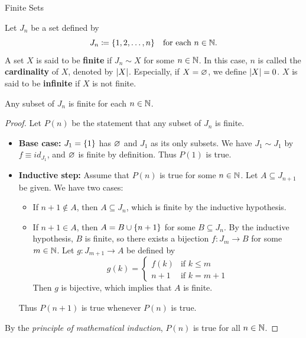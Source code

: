 \begin{section}{Finite Sets} \label{sec:FiniteSets}

Let $J_{n}$ be a set defined by
\[
J_{n} \coloneqq \set*{1, 2, \dots, n} \quad \text{for each } n \in \N.
\]
A set $X$ is said to be \textbf{finite} if $J_{n} \hyperref[thm:BijectionEquivalenceRelation]{\sim} X$ for some
$n \in \N$. In this case, $n$ is called the \textbf{cardinality} of $X$, denoted by $\abs*{X}$.
Especially, if $X = \vnot$, we define $\abs*{X} = 0$. $X$ is said to be \textbf{infinite} if $X$ is not finite.

\bigskip

\begin{lemma} \label{lem:SubsetOfJnIsFinite}
    Any subset of $J_{n}$ is finite for each $n \in \N$.
\end{lemma}

\begin{proof}
    Let $P(n)$ be the statement that any subset of $J_{n}$ is finite.
    \begin{itemize}
        \item \textbf{Base case:} $J_{1} = \set*{1}$ has $\vnot$ and $J_{1}$ as its only subsets. We have
        $J_{1} \hyperref[thm:BijectionEquivalenceRelation]{\sim} J_{1}$ by $f \equiv id_{J_{1}}$, and $\vnot$ is
        finite by definition. Thus $P(1)$ is true.
        \item \textbf{Inductive step:} Assume that $P(n)$ is true for some $n \in \N$.
        Let $A \subseteq J_{n + 1}$ be given. We have two cases:
        \begin{itemize}
            \item If $n + 1 \notin A$, then $A \subseteq J_{n}$, which is finite by the inductive hypothesis.
            \item If $n + 1 \in A$, then $A = B \cup \set*{n + 1}$ for some $B \subseteq J_{n}$.
            By the inductive hypothesis, $B$ is finite, so there exists a bijection $f: J_{m} \to B$
            for some $m \in \N$. Let $g: J_{m + 1} \to A$ be defined by
            \[
            g(k) = \begin{cases}
                f(k) & \text{if } k \leq m \\
                n + 1 & \text{if } k = m + 1
            \end{cases}
            \]
            Then $g$ is bijective, which implies that $A$ is finite.
        \end{itemize}
        Thus $P(n + 1)$ is true whenever $P(n)$ is true.
    \end{itemize}
    By the \emph{principle of mathematical induction}, $P(n)$ is true for all $n \in \N$.
\end{proof}


\end{section}
